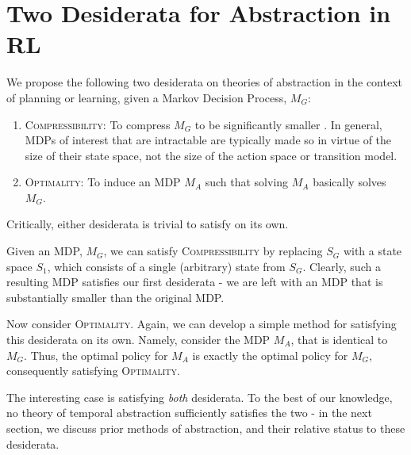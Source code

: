 \section{Two Desiderata for Abstraction in RL}

We propose the following two desiderata on theories of abstraction in the context of planning or learning, given a Markov Decision Process, $M_G$:
\begin{enumerate}
\item \textsc{Compressibility}: To compress $M_G$ to be significantly smaller . In general, \acp{MDP} of interest that are intractable are typically made so in virtue of the size of their state space, not the size of the action space or transition model.
\item \textsc{Optimality}: To induce an MDP $M_A$ such that solving $M_A$ basically solves $M_G$.
\end{enumerate}


Critically, either desiderata is trivial to satisfy on its own.

Given an \ac{MDP}, $M_G$, we can satisfy \textsc{Compressibility} by replacing $S_G$ with a state space $S_1$, which consists of a single (arbitrary) state from $S_G$. Clearly, such a resulting \ac{MDP} satisfies our first desiderata - we are left with an MDP that is substantially smaller than the original MDP.

Now consider \textsc{Optimality}. Again, we can develop a simple method for satisfying this desiderata on its own. Namely, consider the MDP $M_A$, that is identical to $M_G$. Thus, the optimal policy for $M_A$ is exactly the optimal policy for $M_G$, consequently satisfying \textsc{Optimality}.

The interesting case is satisfying {\it both} desiderata. To the best of our knowledge, no theory of temporal abstraction sufficiently satisfies the two - in the next section, we discuss prior methods of abstraction, and their relative status to these desiderata.